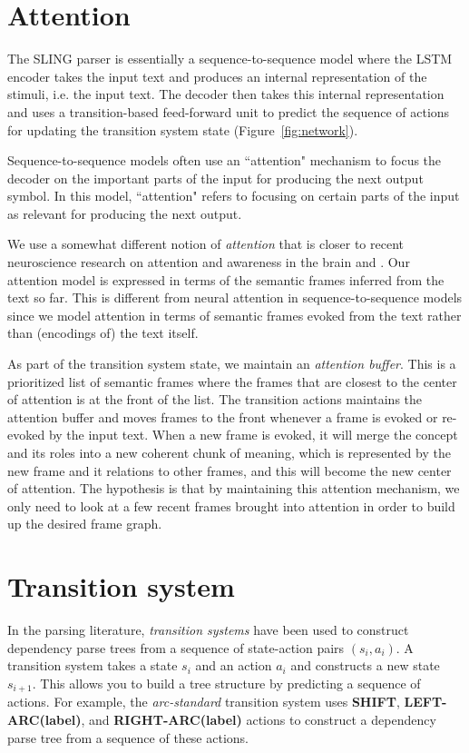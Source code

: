\documentclass[11pt,a4paper]{article}
\begin{document}
\section{Attention}
\label{sec:att}

The SLING parser is essentially a sequence-to-sequence model where the LSTM
encoder takes the input text and produces an internal representation of the
stimuli, i.e. the input text.
The decoder then takes this internal representation and uses a transition-based
feed-forward unit to predict the sequence of actions for updating the transition
system state (Figure~\ref{fig:network}).

Sequence-to-sequence models often use an ``attention" mechanism to focus
the decoder on the important parts of the input for producing the next output
symbol. In this model, ``attention" refers to focusing on certain parts of the
input as relevant for producing the next output.

We use a somewhat different notion of \emph{attention} that is closer to
recent neuroscience research on attention and awareness in the brain
\cite{nelson2017} and \cite{graziano2013}.
Our attention model is expressed in terms of the semantic frames inferred from
the text so far.
This is different from neural attention in sequence-to-sequence models
since we model attention in terms of semantic frames evoked from the text rather
than (encodings of) the text itself.

As part of the transition system state, we maintain an \emph{attention buffer}.
This is a prioritized list of semantic frames where the frames that are closest
to the center of attention is at the front of the list. The transition actions
maintains the attention buffer and moves frames to the front whenever a frame
is evoked or re-evoked by the input text. When a new frame is evoked, it will
merge the concept and its roles into a new coherent chunk of meaning, which is
represented by the new frame and it relations to other frames, and this will
become the new center of attention. The hypothesis is that by maintaining this
attention mechanism, we only need to look at a few recent frames brought into
attention in order to build up the desired frame graph.

\section{Transition system}
\label{sec:ts}

In the parsing literature, \emph{transition systems} have been
used to construct dependency parse trees from a sequence of state-action pairs
$(s_i,a_i)$. A transition system takes a state $s_i$ and an action $a_i$ and
constructs a new state $s_{i+1}$. This allows you to build a tree structure by
predicting a sequence of actions. For example, the \emph{arc-standard}
transition system \cite{nivre2006} uses {\bf SHIFT}, {\bf LEFT-ARC(label)}, and
{\bf RIGHT-ARC(label)} actions to construct a dependency parse tree from a
sequence of these actions.
\end{document}

